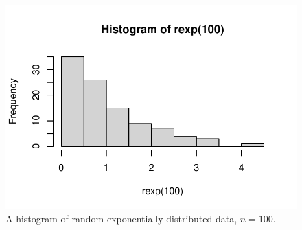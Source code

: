 \documentclass{article}\usepackage[]{graphicx}\usepackage[]{xcolor}
\makeatletter
\def\maxwidth{ %
  \ifdim\Gin@nat@width>\linewidth
    \linewidth
  \else
    \Gin@nat@width
  \fi
}
\newenvironment{knitrout}{}{} %
\makeatother
\begin{document}
\begin{multicols}{2}
\begin{figure}[H]
\begin{center}
\begin{knitrout}
\color{fgcolor}
\includegraphics[width=\maxwidth]{figure/unnamed-chunk-6-1} 
\end{knitrout}
\caption{A histogram of random exponentially distributed data, $n=100$.}
\label{plot1} %
\end{center}
\end{figure}

\columnbreak


\end{multicols}
\end{document}

